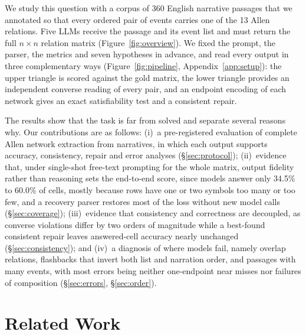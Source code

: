 \documentclass[11pt]{article}
\begin{document}
We study this question with a corpus of 360 English narrative passages that we annotated so that every ordered pair of events carries one of the 13 Allen relations. Five LLMs receive the passage and its event list and must return the full $n\times n$ relation matrix (Figure~\ref{fig:overview}). We fixed the prompt, the parser, the metrics and seven hypotheses in advance, and read every output in three complementary ways (Figure~\ref{fig:pipeline}, Appendix~\ref{app:setup}): the upper triangle is scored against the gold matrix, the lower triangle provides an independent converse reading of every pair, and an endpoint encoding of each network gives an exact satisfiability test and a consistent repair.


The results show that the task is far from solved and separate several reasons why. Our contributions are as follows: (i)~a pre-registered evaluation of complete Allen network extraction from narratives, in which each output supports accuracy, consistency, repair and error analyses (\S\ref{sec:protocol}); (ii)~evidence that, under single-shot free-text prompting for the whole matrix, output fidelity rather than reasoning sets the end-to-end score, since models answer only 34.5\% to 60.0\% of cells, mostly because rows have one or two symbols too many or too few, and a recovery parser restores most of the loss without new model calls (\S\ref{sec:coverage}); (iii)~evidence that consistency and correctness are decoupled, as converse violations differ by two orders of magnitude while a best-found consistent repair leaves answered-cell accuracy nearly unchanged (\S\ref{sec:consistency}); and (iv)~a diagnosis of where models fail, namely overlap relations, flashbacks that invert both list and narration order, and passages with many events, with most errors being neither one-endpoint near misses nor failures of composition (\S\ref{sec:errors}, \S\ref{sec:order}).

\section{Related Work}
\label{sec:related}
\end{document}
